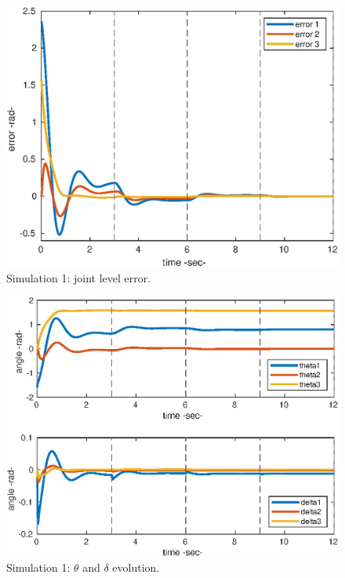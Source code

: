 \begin{figure}[h!]
\centerline{\includegraphics[scale=0.65]{figures/1_1_error.eps}}
\caption{\label{1_1err}
Simulation 1: joint level error.}
\end{figure}

\begin{figure}[h!]
\centerline{\includegraphics[scale=0.65]{figures/1_1_thetadelta.eps}}
\caption{\label{1_1qt}
Simulation 1: $\theta$ and $\delta$ evolution.}
\end{figure}

